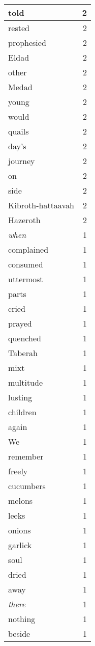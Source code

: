 \begin{center}
\begin{longtable}{l|r}
told & 2 \\ \hline
rested & 2 \\ \hline
prophesied & 2 \\ \hline
Eldad & 2 \\ \hline
other & 2 \\ \hline
Medad & 2 \\ \hline
young & 2 \\ \hline
would & 2 \\ \hline
quails & 2 \\ \hline
day's & 2 \\ \hline
journey & 2 \\ \hline
on & 2 \\ \hline
side & 2 \\ \hline
Kibroth-hattaavah & 2 \\ \hline
Hazeroth & 2 \\ \hline
\emph{when} & 1 \\ \hline
complained & 1 \\ \hline
consumed & 1 \\ \hline
uttermost & 1 \\ \hline
parts & 1 \\ \hline
cried & 1 \\ \hline
prayed & 1 \\ \hline
quenched & 1 \\ \hline
Taberah & 1 \\ \hline
mixt & 1 \\ \hline
multitude & 1 \\ \hline
lusting & 1 \\ \hline
children & 1 \\ \hline
again & 1 \\ \hline
We & 1 \\ \hline
remember & 1 \\ \hline
freely & 1 \\ \hline
cucumbers & 1 \\ \hline
melons & 1 \\ \hline
leeks & 1 \\ \hline
onions & 1 \\ \hline
garlick & 1 \\ \hline
soul & 1 \\ \hline
dried & 1 \\ \hline
away & 1 \\ \hline
\emph{there} & 1 \\ \hline
nothing & 1 \\ \hline
beside & 1 \\ \hline

\end{longtable}
\end{center}
